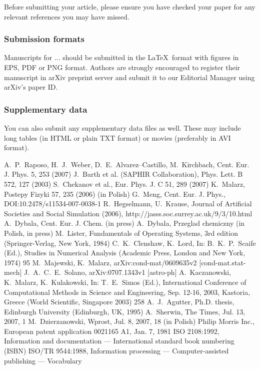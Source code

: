 \documentclass[USenglish,oneside,twocolumn]{article}
\begin{document}
Before submitting your article, please ensure you have checked your paper for any relevant references you may have missed.

\subsubsection{Submission formats}

Manuscripts for ... should be submitted in the \LaTeX ~format with figures in EPS, PDF or PNG format. Authors are strongly encouraged to register their manuscript in arXiv preprint server and submit it to our Editorial Manager using arXiv's paper ID.

\subsubsection{Supplementary data}

You can also submit any supplementary data files as well. These may include long tables (in HTML or plain TXT format) or movies (preferably in AVI format).

\begin{thebibliography}{99}
 A.~P.~Raposo, H.~J.~Weber, D.~E.~Alvarez--Castillo, M.~Kirchbach, Cent. Eur. J. Phys. 5, 253 (2007)
 J.~Barth et al. (SAPHIR Collaboration), Phys. Lett. B 572, 127 (2003)
 S.~Chekanov et al., Eur. Phys. J. C 51, 289 (2007)
 K.~Malarz, Postepy Fizyki 57, 235 (2006) (in Polish)
 G.~Meng, Cent. Eur. J. Phys., DOI:10.2478/s11534-007-0038-1
 R.~Hegselmann, U.~Krause, Journal of Artificial Societies and Social Simulation (2006), http://jasss.soc.surrey.ac.uk/9/3/10.html
 A.~Dybala, Cent. Eur. J. Chem. (in press)
 A.~Dybala, Przeglad chemiczny (in Polish, in press)
 M.~Lister, Fundamentals of Operating Systems, 3rd edition (Springer-Verlag, New York, 1984)
 C.~K.~Clenshaw, K.~Lord, In: B.~K.~P.~Scaife (Ed.), Studies in Numerical Analysis (Academic Press, London and New York, 1974) 95
 M.~Majewski, K.~Malarz, arXiv:cond-mat/0609635v2 [cond-mat.stat-mech]
 J.~A.~C.~E.~Solano, arXiv:0707.1343v1 [astro-ph]
 A.~Kaczanowski, K.~Malarz, K.~Kulakowski, In: T.~E.~Simos (Ed.), International Conference of Computational Methods in Science and Engineering, Sep. 12-16, 2003, Kastoria, Greece (World Scientific, Singapore 2003) 258
 A.~J.~Agutter, Ph.D. thesis, Edinburgh University (Edinburgh, UK, 1995)
 A.~Sherwin, The Times, Jul. 13, 2007, 1
 M.~Dzierzanowski, Wprost, Jul. 8, 2007, 18 (in Polish)
 Philip Morris Inc., European patent application 0021165 A1, Jan. 7, 1981
 ISO 2108:1992, Information and documentation --- International standard book numbering (ISBN)
 ISO/TR 9544:1988, Information processing --- Computer-assisted publishing --- Vocabulary
\end{thebibliography}
\end{document}
